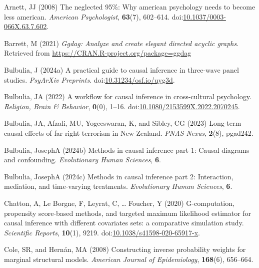 \documentclass[
  single column]{article}
\newlength{\cslhangindent}
\newenvironment{CSLReferences}[2] %
 {\begin{list}{}{%
  \setlength{\itemindent}{0pt}
  \setlength{\leftmargin}{0pt}
  \setlength{\parsep}{0pt}
  \ifodd #1
   \setlength{\leftmargin}{\cslhangindent}
   \setlength{\itemindent}{-1\cslhangindent}
  \fi
  \setlength{\itemsep}{#2\baselineskip}}}
 {\end{list}}
\begin{document}
\label{refs}
\begin{CSLReferences}{1}{0}
Arnett, JJ (2008) The neglected 95\%: Why american psychology needs to
become less american. \emph{American Psychologist}, \textbf{63}(7),
602--614.
doi:\href{https://doi.org/10.1037/0003-066X.63.7.602}{10.1037/0003-066X.63.7.602}.

Barrett, M (2021) \emph{Ggdag: Analyze and create elegant directed
acyclic graphs}. Retrieved from
\url{https://CRAN.R-project.org/package=ggdag}

Bulbulia, J (2024a) A practical guide to causal inference in three-wave
panel studies. \emph{PsyArXiv Preprints}.
doi:\href{https://doi.org/10.31234/osf.io/uyg3d}{10.31234/osf.io/uyg3d}.

Bulbulia, JA (2022) A workflow for causal inference in cross-cultural
psychology. \emph{Religion, Brain \& Behavior}, \textbf{0}(0), 1--16.
doi:\href{https://doi.org/10.1080/2153599X.2022.2070245}{10.1080/2153599X.2022.2070245}.

Bulbulia, JA, Afzali, MU, Yogeeswaran, K, and Sibley, CG (2023)
Long-term causal effects of far-right terrorism in {N}ew {Z}ealand.
\emph{PNAS Nexus}, \textbf{2}(8), pgad242.

Bulbulia, JosephA (2024b) Methods in causal inference part 1: Causal
diagrams and confounding. \emph{Evolutionary Human Sciences},
\textbf{6}.

Bulbulia, JosephA (2024c) Methods in causal inference part 2:
Interaction, mediation, and time-varying treatments. \emph{Evolutionary
Human Sciences}, \textbf{6}.

Chatton, A, Le Borgne, F, Leyrat, C, \ldots{} Foucher, Y (2020)
G-computation, propensity score-based methods, and targeted maximum
likelihood estimator for causal inference with different covariates
sets: a comparative simulation study. \emph{Scientific Reports},
\textbf{10}(1), 9219.
doi:\href{https://doi.org/10.1038/s41598-020-65917-x}{10.1038/s41598-020-65917-x}.

Cole, SR, and Hernán, MA (2008) Constructing inverse probability weights
for marginal structural models. \emph{American Journal of Epidemiology},
\textbf{168}(6), 656--664.


\end{CSLReferences}
\end{document}
